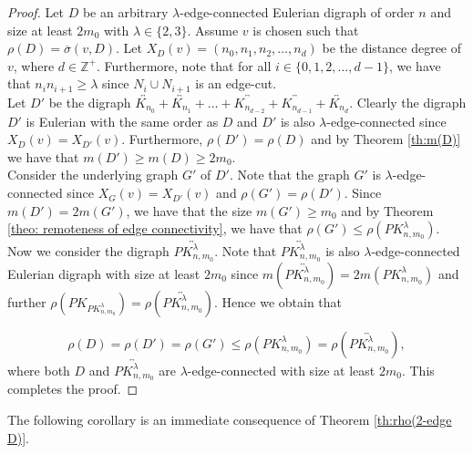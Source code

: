 \documentclass[a4paper,11pt]{article}
\begin{document}
\begin{proof}
Let $D$ be an arbitrary $\lambda$-edge-connected Eulerian digraph of order $n$ and size at least $2m_{0}$ with $\lambda\in\{2,3\}$. Assume $v$ is chosen such that $\rho(D)=\overline{\sigma}(v,D)$. Let $X_{D}(v)=(n_{0},n_{1},n_{2},\ldots,n_{d})$ be the distance degree of $v$, where $d \in \mathbb{Z}^{+}$. Furthermore, note that for all $ i \in \{0,1,2, \ldots, d-1\} $, we have that $ n_in_{i+1} \geq \lambda $ since $N_i \cup N_{i+1}$ is an edge-cut. \\

\noindent Let $D'$ be the digraph  $\overleftrightarrow{K_{n_0}} + \overleftrightarrow{K_{n_1}} + \ldots + \overleftrightarrow{K_{n_{d-2}}} + \overleftrightarrow{K_{n_{d-1}}} + \overleftrightarrow{K_{n_d}}$. Clearly the digraph $D'$ is Eulerian with the same order as $D$ and $D'$ is also $\lambda$-edge-connected since $X_{D}(v)=X_{D'}(v)$. Furthermore, $\rho(D')=\rho(D)$ and by Theorem \ref{th:m(D)} we have that  $m(D') \geq m(D) \geq 2m_0$.\\

\noindent Consider the underlying graph $G'$ of $D'$.
Note that the graph $G'$ is $\lambda$-edge-connected since  $X_{G}(v)=X_{D'}(v)$ and $\rho(G')=\rho(D')$. Since $m(D') = 2m(G')$, we have that the size $m(G') \geq m_0$ and by Theorem \ref{theo: remoteness of edge connectivity}, we have that $\rho(G') \leq \rho(PK^{\lambda}_{n,m_0})$. \\

\noindent Now we consider the digraph $\overleftrightarrow{PK^{\lambda}_{n,m_0}}$. Note that $\overleftrightarrow{PK^{\lambda}_{n,m_0}}$ is also $\lambda$-edge-connected Eulerian digraph with size at least $2m_0$ since $m(\overleftrightarrow{PK^{\lambda}_{n,m_0}})=2m(PK^{\lambda}_{n,m_0})$  and further $\rho(PK_{PK^{\lambda}_{n,m_0}})=\rho(\overleftrightarrow{PK^{\lambda}_{n,m_0}})$. Hence we obtain that 

\[ \rho(D) = \rho(D') = \rho(G') 
       \leq \rho(PK^{\lambda}_{n,m_0})
    = \rho(\overleftrightarrow{PK^{\lambda}_{n,m_0}}),
\]
where both $D$ and $\overleftrightarrow{PK^{\lambda}_{n,m_0}}$ are $\lambda$-edge-connected with size at least $2m_0$. This completes the proof.
\end{proof} 

The following corollary is an immediate consequence of Theorem \ref{th:rho(2-edge D)}.
\end{document}
